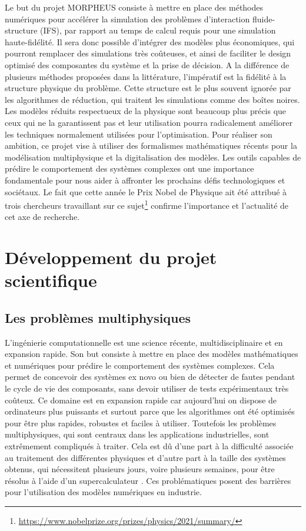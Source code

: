 \documentclass[12pt, french]{article}
\begin{document}
	Le but du projet MORPHEUS consiste à mettre en place des méthodes numériques
	pour accélérer la simulation des problèmes d'interaction fluide-structure (IFS), par rapport au temps de calcul requis pour une simulation haute-fidélité. Il sera donc possible d'intégrer des modèles plus économiques, qui pourront remplacer des simulations très coûteuses, et ainsi de faciliter le design optimisé des composantes du système et la prise de décision. A la différence de plusieurs méthodes proposées dans la littérature, l'impératif est la fidélité à la structure physique du problème.  Cette structure est le plus souvent ignorée par les algorithmes de réduction, qui traitent les simulations comme des boîtes noires. Les modèles réduits respectueux de la physique sont beaucoup plus précis que ceux qui ne la garantissent pas et leur utilisation pourra radicalement améliorer les techniques normalement utilisées pour l'optimisation. Pour réaliser son ambition, ce projet vise à utiliser des formalismes mathématiques récents pour la modélisation multiphysique et la digitalisation des modèles. Les outils capables de prédire le comportement des systèmes complexes ont une importance fondamentale pour nous aider à affronter les prochains défis technologiques et sociétaux. Le fait que cette année le Prix Nobel de Physique ait été attribué à trois chercheurs travaillant sur ce sujet\footnote{\url{https://www.nobelprize.org/prizes/physics/2021/summary/}} confirme
	l'importance et l'actualité de cet axe de recherche.
	
	
	\section{Développement du projet scientifique}
	
	\subsection{Les problèmes multiphysiques}
	L'ingénierie computationnelle est une science récente, multidisciplinaire et en expansion rapide. Son but consiste à mettre en place des modèles mathématiques et numériques pour prédire le comportement des systèmes complexes. Cela permet de concevoir des systèmes ex novo ou bien de détecter de fautes pendant le cycle de vie des composants, sans devoir utiliser de tests expérimentaux très co\^{u}teux. Ce domaine est en expansion rapide car aujourd'hui on dispose de ordinateurs plus puissants et surtout parce que les algorithmes ont été optimisés pour être plus rapides, robustes et faciles à utiliser. Toutefois les problèmes multiphysiques, qui sont centraux dans les applications industrielles, sont extrêmement compliqués à traiter. Cela est d\^u d'une part à la difficulté associée au traitement des différentes physiques et d'autre part à la taille des systèmes obtenus, qui nécessitent plusieurs jours, voire plusieurs semaines, pour être résolus à l'aide d'un supercalculateur \cite{keyes2013}. Ces problématiques posent des barrières pour l'utilisation des modèles numériques en industrie. 
	
\end{document}

